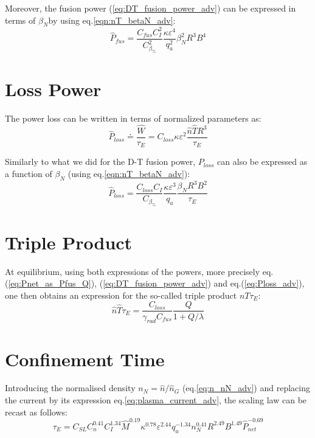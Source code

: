 Moreover, the fusion power (\ref{eq:DT_fusion_power_adv}) can be expressed in terms of $\beta_N$by using eq.\ref{eqn:nT_betaN_adv}:
\begin{equation}
\boxed{
		\hat P_{fus} 
	= 
	\frac{C_{fus}C_I^2}{C_{\beta_\%}^2} \frac{\kappa \varepsilon^4}{q_a^2} 
	\beta_N^2 R^3 B^4
}
\label{eq:DT_fusion_power_betaN_adv}
\end{equation}

\section{Loss Power}
The power loss can be written in terms of normalized parameters as:
\begin{equation}
	\hat P_{loss} \doteq \frac{\hat W}{\tau_E} 
	= C_{loss} \kappa \varepsilon^2  \frac{\hat n \hat T R^3}{\tau_E}
\label{eq:Ploss_adv}
\end{equation}

Similarly to what we did for the D-T fusion power, $P_{loss}$ can also be expressed as a function of $\beta_N$ (using eq.\ref{eqn:nT_betaN_adv}):
\begin{equation}
	\hat P_{loss} 
	= 
	\frac{C_{loss}C_I}{C_\beta_\%}  \frac{\kappa \varepsilon^3}{q_a}
	\frac{\beta_N R^3 B^2}{\tau_E}
\label{eq:Ploss_betaN_adv}
\end{equation}

\section{Triple Product}
At equilibrium, using both expressions of the powers, more precisely eq.(\ref{eq:Pnet_as_Pfus_Q}), (\ref{eq:DT_fusion_power_adv}) and eq.(\ref{eq:Ploss_adv}), one then obtains an expression for the so-called triple product $nT\tau_E$:
\begin{equation}
	\hat n \hat T \tau_E = \frac{C_{loss}}{\gamma_{rad} C_{fus}} \frac{Q}{1+Q/\lambda}
\label{eq:nTtau_Q_adv}
\end{equation}


\section{Confinement Time}
Introducing the normalised density $n_N = \hat n/\hat n_G$ (eq.\ref{eq:n_nN_adv}) and replacing the current by its expression eq.\ref{eq:plasma_current_adv}, the scaling law can be recast as follows:
\begin{equation*}
\tau_E = C_{SL} C_n^{0.41} C_I^{1.34} \hat M^{0.19} \kappa^{0.78} \varepsilon^{2.44} q_a^{-1.34}
n_N^{0.41} R^{2.49} B^{1.49} \hat P_{net}^{-0.69}
\end{equation*}

